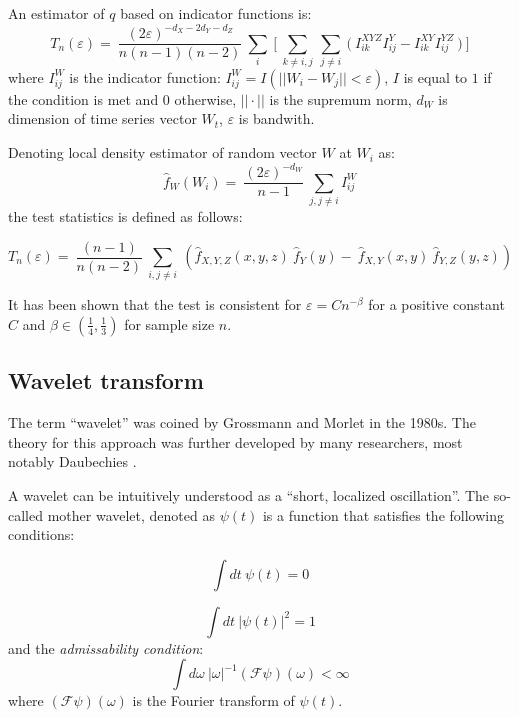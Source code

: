 An estimator of $q$ based on indicator functions is:
\begin{equation}
    T_n(\varepsilon)= \
    \frac{(2\varepsilon)^{-d_X -2d_Y -d_Z}}{n(n-1)(n-2)} \
    \sum_i \
    \bigg[ \
    \sum_{k \neq i,j} \
    \sum_{j \neq i} \
    \Big( \
    I^{XYZ}_{ik} I^{Y}_{ij} - I^{XY}_{ik} I^{YZ}_{ij} \
    \Big) \
    \bigg]
\end{equation}
where $I^W_{ij}$ is the indicator function: $I^W_{ij} = I(||W_i-W_j||<\varepsilon)$, $I$ is equal to $1$ if the condition is met and $0$ otherwise,
$||\cdot||$ is the supremum norm,
$d_W$ is dimension of time series vector $W_t$,
$\varepsilon$ is bandwith.
   
Denoting local density estimator of random vector $W$ at $W_i$ as:
\begin{equation}
    \hat{f}_W(W_i)=\
    \frac{(2\varepsilon)^{-d_W}}{n-1}\
    \sum_{j,j \neq i} I^W_{ij}
\end{equation}
the test statistics is defined as follows:

\begin{equation} \label{eq:diks-panchenko-test}
    T_n(\varepsilon) = \
    \frac{(n-1)}{n(n-2)} \
    \sum_{i,j \neq i} \
    (\hat{f}_{X,Y,Z}(x,y,z) \
    \hat{f}_Y(y) - \
    \hat{f}_{X,Y}(x,y) \
    \hat{f}_{Y,Z}(y,z))
\end{equation}

It has been shown that the test is consistent for $\varepsilon = C n^{-\beta}$ for a positive constant $C$ and $\beta \in (\frac{1}{4}, \frac{1}{3})$ for sample size $n$.

\subsection{Wavelet transform} \label{sec:wavelet}
The term ``wavelet'' was coined by Grossmann and Morlet \cite{grossmann-morlet}  in the 1980s. 
The theory for this approach was further developed by many researchers, most notably Daubechies \cite{daubechies1990}.

A wavelet can be intuitively understood as a ``short, localized oscillation''.
The so-called mother wavelet, denoted as $\psi(t)$ is a function that satisfies the following conditions:

\begin{equation} \label{eq:wavelet-zero-mean}
	\int\! dt \: \psi (t) = 0
\end{equation}

\begin{equation} \label{eq:wavelet-norm}
	\int\! dt \: |\psi (t)|^2 = 1
\end{equation}
and the \emph{admissability condition}:
\begin{equation}
	\int\! d\omega \: |\omega|^{-1} \left(\mathscr{F} \psi\right)(\omega) < \infty
\end{equation}
where $\left(\mathscr{F} \psi\right)(\omega)$ is the Fourier transform of $\psi(t)$.

